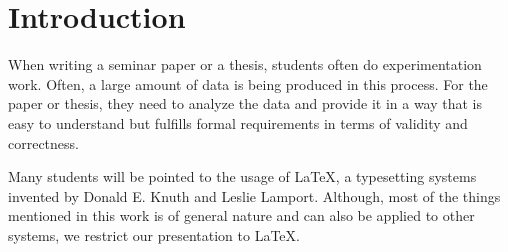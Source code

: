 \section{Introduction}

When writing a seminar paper or a thesis, students often do experimentation
work.  Often, a large amount of data is being produced in this process.  For the
paper or thesis, they need to analyze the data and provide it in a way that is
easy to understand but fulfills formal requirements in terms of validity and
correctness.

Many students will be pointed to the usage of \LaTeX{}, a typesetting systems
invented by Donald E\@. Knuth and Leslie Lamport.  Although, most of the things
mentioned in this work is of general nature and can also be applied to other
systems, we restrict our presentation to \LaTeX.

\nocite{*}
